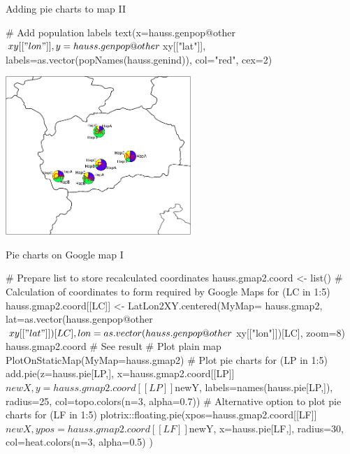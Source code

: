 \documentclass[compress, ucs, xelatex, 11pt, xcolor=svgnames,
	hyperref={
		bookmarks=true,
		unicode=true,
		colorlinks=true,
		pdftitle={Molecular data in R},
		plainpages=false,
		pdfauthor={Vojtech Zeisek},
		pdfsubject={Course about phylogeny and evolution in R},
		pdfcreator={XeLaTeX},
		pdfkeywords={R, evolution, phylogeny, molecular data},
		linkcolor=Tomato,
		anchorcolor=SaddleBrown,
		citecolor=Goldenrod,
		filecolor=DarkMagenta,
		menucolor=Sienna,
		urlcolor=DarkTurquoise,
		pdftex},
	url={hyphens, lowtilde} %
	]{beamer}
\begin{document}
\begin{frame}[fragile]{Adding pie charts to map II}
	\begin{spluscode}
    # Add population labels
    text(x=hauss.genpop@other$xy[["lon"]], y=hauss.genpop@other$xy[["lat"]],
      labels=as.vector(popNames(hauss.genind)), col="red", cex=2)
	\end{spluscode}
	\begin{center}
		\includegraphics[height=6cm]{map_pie.png}
	\end{center}
\end{frame}

\begin{frame}[fragile]{Pie charts on Google map I}
	\begin{spluscode}
    # Prepare list to store recalculated coordinates
    hauss.gmap2.coord <- list()
    # Calculation of coordinates to form required by Google Maps
    for (LC in 1:5) { hauss.gmap2.coord[[LC]] <- LatLon2XY.centered(MyMap=
      hauss.gmap2, lat=as.vector(hauss.genpop@other$xy[["lat"]])[LC],
      lon=as.vector(hauss.genpop@other$xy[["lon"]])[LC], zoom=8) }
    hauss.gmap2.coord # See result
    # Plot plain map
    PlotOnStaticMap(MyMap=hauss.gmap2)
    # Plot pie charts
    for (LP in 1:5) { add.pie(z=hauss.pie[LP,], x=hauss.gmap2.coord[[LP]]
      $newX, y=hauss.gmap2.coord[[LP]]$newY, labels=names(hauss.pie[LP,]),
      radius=25, col=topo.colors(n=3, alpha=0.7)) }
    # Alternative option to plot pie charts
    for (LF in 1:5) { plotrix::floating.pie(xpos=hauss.gmap2.coord[[LF]]
      $newX, ypos=hauss.gmap2.coord[[LF]]$newY, x=hauss.pie[LF,], radius=30,
      col=heat.colors(n=3, alpha=0.5) ) }
	\end{spluscode}
\end{frame}
\end{document}
